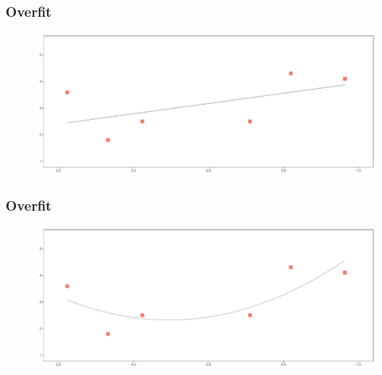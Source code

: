 \documentclass[
  shownotes,
  xcolor={svgnames},
  hyperref={colorlinks,citecolor=DarkBlue,linkcolor=DarkRed,urlcolor=DarkBlue}
  , aspectratio=169]{beamer}
\begin{document}
\begin{frame}
\frametitle{Overfit}


        \begin{figure}[H] \centering
            \captionsetup{justification=centering}
              \includegraphics[scale=0.4]{figures/fig_1b.pdf}
 \end{figure}

\end{frame}
\begin{frame}
\frametitle{Overfit}


        \begin{figure}[H] \centering
            \captionsetup{justification=centering}
              \includegraphics[scale=0.4]{figures/fig_1c.pdf}
 \end{figure}

\end{frame}
\end{document}

